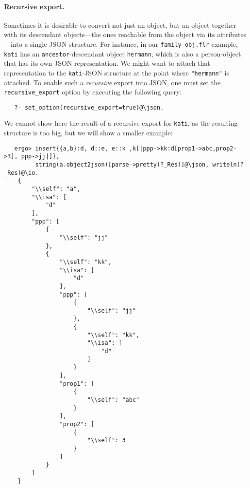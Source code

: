 \paragraph{Recursive export.} Sometimes it is desirable to convert not just
an object, but an object together with its descendant objects---the ones
reachable from the object via its attributes---into a single JSON
structure. For instance, in our \texttt{family\_obj.flr}  example,
\texttt{kati} has an \texttt{ancestor}-descendant object \texttt{hermann},
which is also a  person-object that has its own JSON representation. We
might want to attach that representation to the \texttt{kati}-JSON
structure at the point where \texttt{"hermann"} is attached.
To enable such a \emph{recursive} export into JSON, one must set the
\texttt{recursive\_export} option by executing the following query:
\begin{verbatim}
   ?- set_option(recursive_export=true)@\json.
\end{verbatim}
We cannot show here the result of a recursive export for \texttt{kati}, as
the resulting structure is too big, but we will show a smaller example:
\begin{verbatim}
   ergo> insert{{a,b}:d, d::e, e::k ,k[|ppp->kk:d[prop1->abc,prop2->3], ppp->jj|]},
         string(a.object2json)[parse->pretty(?_Res)]@\json, writeln(?_Res)@\io.
    {
        "\\self": "a",
        "\\isa": [
            "d"
        ],
        "ppp": [
            {
                "\\self": "jj"
            },
            {
                "\\self": "kk",
                "\\isa": [
                    "d"
                ],
                "ppp": [
                    {
                        "\\self": "jj"
                    },
                    {
                        "\\self": "kk",
                        "\\isa": [
                            "d"
                        ]
                    }
                ],
                "prop1": [
                    {
                        "\\self": "abc"
                    }
                ],
                "prop2": [
                    {
                        "\\self": 3
                    }
                ]
            }
        ]
    }
\end{verbatim}
